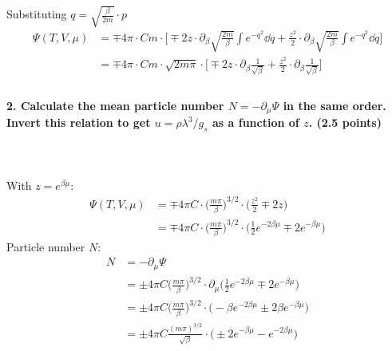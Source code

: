     Substituting $q=\sqrt{\frac{\beta}{2m}}\cdot p$
    \begin{align}
        \Psi(T,V,\mu)
        &=\mp 4\pi\cdot Cm\cdot\bigg[
            \mp2z\cdot\partial_\beta
                \sqrt{\frac{2m}{\beta}}
                \int e^{-q^2} \dd q
            +\frac{z^2}{2}\cdot\partial_\beta
                \sqrt{\frac{2m}{\beta}}
                \int e^{-q^2} \dd q
        \bigg] \\
        &=\mp 4\pi\cdot Cm\cdot\sqrt{2m\pi}\cdot\bigg[
            \mp2z\cdot\partial_\beta
                \frac{1}{\sqrt{\beta}}
            +\frac{z^2}{2}\cdot\partial_\beta
                \frac{1}{\sqrt{\beta}}
        \bigg] \\
    \end{align}

\newpage
\paragraph{2. Calculate the mean particle number 
    $N =-\partial_\mu\Psi$ in the same order. Invert this 
    relation to get $u=\rho\lambda^3/g_s$ as a function of $z$. 
    (2.5 points)
} \ \\
    \\
    With $z=e^{\beta\mu}$:
    \begin{align}
        \Psi(T,V,\mu)
        &=\mp 4\pi C\cdot\bigg(
            \frac{m\pi}{\beta}
            \bigg)^{3/2}\cdot\bigg(
            \frac{z^2}{2}\mp2z
        \bigg) \\
        &=\mp 4\pi C\cdot\bigg(
            \frac{m\pi}{\beta}
            \bigg)^{3/2}\cdot\bigg(
            \frac{1}{2}e^{-2\beta\mu}\mp2e^{-\beta\mu}
        \bigg)
    \end{align}
    Particle number $N$:
    \begin{align}
        N
        &=-\partial_\mu\Psi \\
        &=\pm 4\pi C\bigg(
            \frac{m\pi}{\beta}
        \bigg)^{3/2}\cdot\partial_\mu\bigg(
            \frac{1}{2}e^{-2\beta\mu}\mp2e^{-\beta\mu}
        \bigg) \\
        &=\pm 4\pi C\bigg(
            \frac{m\pi}{\beta}
        \bigg)^{3/2}\cdot\bigg(
            -\beta e^{-2\beta\mu}\pm2\beta e^{-\beta\mu}
        \bigg) \\
        &=\pm 4\pi C\frac{(m\pi)^{3/2}}{\sqrt{\beta}}
        \cdot\bigg(
            \pm2e^{-\beta\mu}-e^{-2\beta\mu}
        \bigg)
    \end{align}

